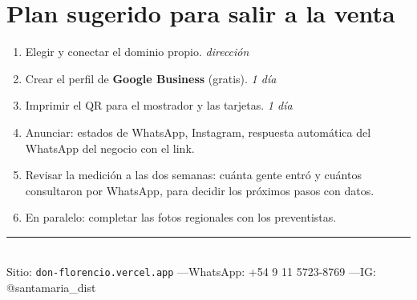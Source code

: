 \documentclass[a4paper,11pt]{article}
\begin{document}
\section{Plan sugerido para salir a la venta}

\begin{enumerate}[leftmargin=1.4em, itemsep=2pt]
  \item Elegir y conectar el dominio propio. \hfill \textit{direcci\'on}
  \item Crear el perfil de \textbf{Google Business} (gratis). \hfill \textit{1 d\'ia}
  \item Imprimir el QR para el mostrador y las tarjetas. \hfill \textit{1 d\'ia}
  \item Anunciar: estados de WhatsApp, Instagram, respuesta autom\'atica del WhatsApp
        del negocio con el link.
  \item Revisar la medici\'on a las dos semanas: cu\'anta gente entr\'o y cu\'antos
        consultaron por WhatsApp, para decidir los pr\'oximos pasos con datos.
  \item En paralelo: completar las fotos regionales con los preventistas.
\end{enumerate}

\vspace{1em}
\begin{center}
\color{vino}\rule{0.6\textwidth}{0.4pt}\\[6pt]
\small Sitio: \texttt{don-florencio.vercel.app} \quad---\quad WhatsApp: +54 9 11 5723-8769 \quad---\quad IG: @santamaria\_dist
\end{center}
\end{document}
